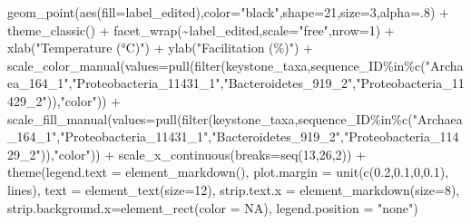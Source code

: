 \documentclass[
  letterpaper,
  DIV=11,
  numbers=noendperiod]{scrreprt}
\newenvironment{Shaded}{\begin{snugshade}}{\end{snugshade}}
\newcommand{\AttributeTok}[1]{\textcolor[rgb]{0.40,0.45,0.13}{#1}}
\newcommand{\ConstantTok}[1]{\textcolor[rgb]{0.56,0.35,0.01}{#1}}
\newcommand{\DecValTok}[1]{\textcolor[rgb]{0.68,0.00,0.00}{#1}}
\newcommand{\FloatTok}[1]{\textcolor[rgb]{0.68,0.00,0.00}{#1}}
\newcommand{\FunctionTok}[1]{\textcolor[rgb]{0.28,0.35,0.67}{#1}}
\newcommand{\NormalTok}[1]{\textcolor[rgb]{0.00,0.23,0.31}{#1}}
\newcommand{\SpecialCharTok}[1]{\textcolor[rgb]{0.37,0.37,0.37}{#1}}
\newcommand{\StringTok}[1]{\textcolor[rgb]{0.13,0.47,0.30}{#1}}
\begin{document}
\begin{Shaded}
\begin{Highlighting}[]
  \FunctionTok{geom\_point}\NormalTok{(}\FunctionTok{aes}\NormalTok{(}\AttributeTok{fill=}\NormalTok{label\_edited),}\AttributeTok{color=}\StringTok{"black"}\NormalTok{,}\AttributeTok{shape=}\DecValTok{21}\NormalTok{,}\AttributeTok{size=}\DecValTok{3}\NormalTok{,}\AttributeTok{alpha=}\NormalTok{.}\DecValTok{8}\NormalTok{) }\SpecialCharTok{+}
  \FunctionTok{theme\_classic}\NormalTok{() }\SpecialCharTok{+}
  \FunctionTok{facet\_wrap}\NormalTok{(}\SpecialCharTok{\textasciitilde{}}\NormalTok{label\_edited,}\AttributeTok{scale=}\StringTok{"free"}\NormalTok{,}\AttributeTok{nrow=}\DecValTok{1}\NormalTok{) }\SpecialCharTok{+}
  \FunctionTok{xlab}\NormalTok{(}\StringTok{"Temperature (°C)"}\NormalTok{) }\SpecialCharTok{+}
  \FunctionTok{ylab}\NormalTok{(}\StringTok{"Facilitation (\%)"}\NormalTok{) }\SpecialCharTok{+}
  \FunctionTok{scale\_color\_manual}\NormalTok{(}\AttributeTok{values=}\FunctionTok{pull}\NormalTok{(}\FunctionTok{filter}\NormalTok{(keystone\_taxa,sequence\_ID}\SpecialCharTok{\%in\%}\FunctionTok{c}\NormalTok{(}\StringTok{"Archaea\_164\_1"}\NormalTok{,}\StringTok{"Proteobacteria\_11431\_1"}\NormalTok{,}\StringTok{"Bacteroidetes\_919\_2"}\NormalTok{,}\StringTok{"Proteobacteria\_11429\_2"}\NormalTok{)),}\StringTok{"color"}\NormalTok{)) }\SpecialCharTok{+}
  \FunctionTok{scale\_fill\_manual}\NormalTok{(}\AttributeTok{values=}\FunctionTok{pull}\NormalTok{(}\FunctionTok{filter}\NormalTok{(keystone\_taxa,sequence\_ID}\SpecialCharTok{\%in\%}\FunctionTok{c}\NormalTok{(}\StringTok{"Archaea\_164\_1"}\NormalTok{,}\StringTok{"Proteobacteria\_11431\_1"}\NormalTok{,}\StringTok{"Bacteroidetes\_919\_2"}\NormalTok{,}\StringTok{"Proteobacteria\_11429\_2"}\NormalTok{)),}\StringTok{"color"}\NormalTok{)) }\SpecialCharTok{+}
  \FunctionTok{scale\_x\_continuous}\NormalTok{(}\AttributeTok{breaks=}\FunctionTok{seq}\NormalTok{(}\DecValTok{13}\NormalTok{,}\DecValTok{26}\NormalTok{,}\DecValTok{2}\NormalTok{)) }\SpecialCharTok{+}
  \FunctionTok{theme}\NormalTok{(}\AttributeTok{legend.text =} \FunctionTok{element\_markdown}\NormalTok{(),}
        \AttributeTok{plot.margin =} \FunctionTok{unit}\NormalTok{(}\FunctionTok{c}\NormalTok{(}\FloatTok{0.2}\NormalTok{,}\FloatTok{0.1}\NormalTok{,}\DecValTok{0}\NormalTok{,}\FloatTok{0.1}\NormalTok{), }\StringTok{\textquotesingle{}lines\textquotesingle{}}\NormalTok{),}
        \AttributeTok{text =} \FunctionTok{element\_text}\NormalTok{(}\AttributeTok{size=}\DecValTok{12}\NormalTok{),}
        \AttributeTok{strip.text.x =} \FunctionTok{element\_markdown}\NormalTok{(}\AttributeTok{size=}\DecValTok{8}\NormalTok{),}
        \AttributeTok{strip.background.x=}\FunctionTok{element\_rect}\NormalTok{(}\AttributeTok{color =} \ConstantTok{NA}\NormalTok{),}
        \AttributeTok{legend.position =} \StringTok{"none"}\NormalTok{)}


\end{Highlighting}
\end{Shaded}
\end{document}
